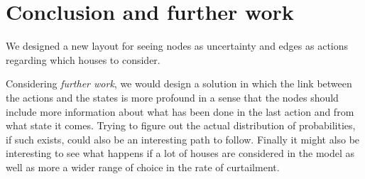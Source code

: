 \section{Conclusion and further work} %
\label{sec:further_work}


We designed a new layout for seeing nodes as uncertainty and edges as actions
regarding which houses to consider.

Considering \emph{further work}, we would design a solution in which
the link between the actions and the states is more profound
in a sense that the nodes should include more information about what
has been done in the last action and from what state it comes.
Trying to figure out the actual distribution of probabilities,
if such exists, could also be an interesting path to follow.
Finally it might also be interesting to see what happens if a lot of houses
are considered in the model as well as more a wider range of choice in the rate of curtailment.


